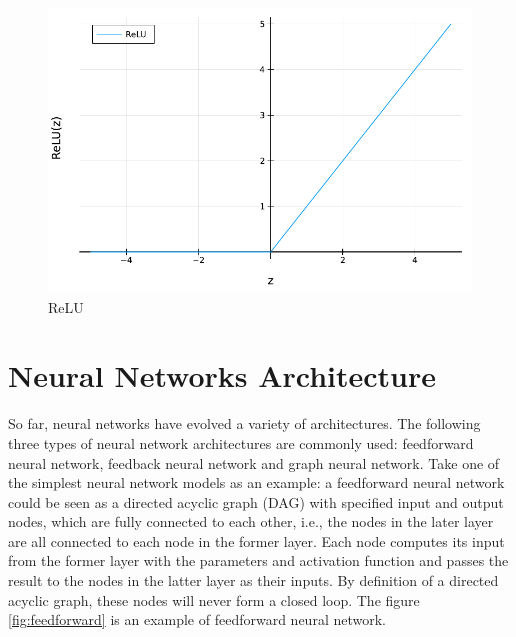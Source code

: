\documentclass[
	parskip, 			   %
	twoside, 			   %
	DIV=14, 			   %
	BCOR=15.0mm, 		   %
	headsepline, 		   %
	open=right, 		   %
	captions=tableheading, %
	bibliography=totoc,    %
	numbers=noenddot       %
]{scrreprt}
\begin{document}
\begin{figure}[h!]
    \centering
    \includegraphics[scale=0.7]{figures/ReLU.pdf}
    \caption{ReLU}
    \label{fig:ReLU}
\end{figure}


\section{Neural Networks Architecture}
So far, neural networks have evolved a variety of architectures. The following three types of neural network architectures are commonly used: feedforward neural network, feedback neural network and graph neural network.
Take one of the simplest neural network models as an example: a feedforward neural network could be seen as a directed acyclic graph (DAG) with specified input and output nodes, which are fully connected to each other, i.e., the nodes in the later layer are all connected to each node in the former layer. Each node computes its input from the former layer with the parameters and activation function and passes the result to the nodes in the latter layer as their inputs. By definition of a directed acyclic graph, these nodes will never form a closed loop. The figure \ref{fig:feedforward} is an example of feedforward neural network.
\end{document}
